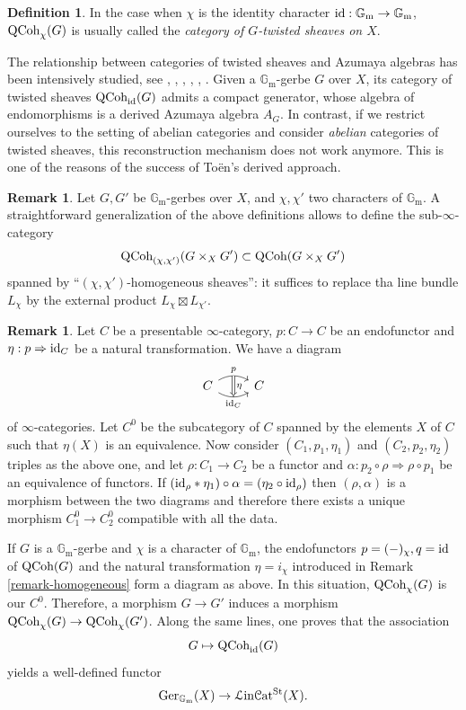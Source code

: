 \documentclass[11pt, twoside]{article} %
\numberwithin{equation}{section}
\theoremstyle{plain}
\theoremstyle{definition}
\newtheorem{defin}[thm]{Definition}
\newtheorem{rem}[thm]{Remark}
\newcommand{\Gm}{\mathbb G_{\mathrm{m}}}
\newcommand{\id}{\textup{id}}
\newcommand{\QCoh}{\textup{QCoh}}
\newcommand{\Ger}{\textup{Ger}}
\newcommand{\Lin}{\mathcal L\textup{in}\mathcal{C}\textup{at}^{\textup{St}}}
\begin{document}
	\begin{defin}\label{twisted-sheaves}
		In the case when $\chi$ is the identity character $\id:\Gm\to \Gm$, $\QCoh_\chi(G)$ is usually called the \textit{category of $G$-twisted sheaves on $X$}.
	\end{defin}
	
	The relationship between categories of twisted sheaves and Azumaya algebras has been intensively studied, see \cite{DeJong}, \cite{DeJong-Gabber}, \cite{Lieblich}, \cite{Hall-Rydh}, \cite{Bergh-Schnurer}, \cite{BP}. Given a $\Gm$-gerbe $G$ over $X$, its category of twisted sheaves $\QCoh_\id(G)$ admits a compact generator, whose algebra of endomorphisms is a derived Azumaya algebra $A_G$. In contrast, if we restrict ourselves to the setting of abelian categories and consider \textit{abelian} categories of twisted sheaves, this reconstruction mechanism does not work anymore. This is one of the reasons of the success of To\"en's derived approach.

 \begin{rem}\label{bi-homogeneous}
     Let $G,G'$ be $\Gm$-gerbes over $X$, and $\chi,\chi'$ two characters of $\Gm$. A straightforward generalization of the above definitions allows to define the sub-$\infty$-category $$\QCoh_{(\chi,\chi')}(G\times_XG')\subset \QCoh(G\times_XG')$$ spanned by ``$(\chi,\chi')$-homogeneous sheaves'': it suffices to replace tha line bundle $L_\chi$ by the external product $L_\chi\boxtimes L_{\chi'}$.
 \end{rem}


\begin{rem}\label{equalizer}
	 Let $C$ be a presentable $\infty$-category, $p:C \rightarrow C$ be an endofunctor and $\eta: p \Rightarrow \id_C$ be a natural transformation. We have a diagram 
 $$\begin{tikzcd}
    C \arrow[bend left]{r}[name=LUU]{p}
    \arrow[bend right]{r}[name=LDD,below]{\id_C}
    \arrow[Rightarrow,to path=(LUU) -- (LDD)\tikztonodes]{r}{\eta}
    & 
    C
  \end{tikzcd}$$ of $\infty$-categories. Let $C^0$ be the subcategory of $C$ spanned by the elements $X$ of $C$ such that $\eta(X)$ is an equivalence. 
Now consider $(C_1,p_1,\eta_1)$ and $(C_2,p_2,\eta_2)$ triples as the above one, and let $\rho:C_1 \rightarrow C_2$ be a functor and $\alpha: p_2\circ \rho \Rightarrow \rho \circ p_1$ be an equivalence of functors. If $(\id_{\rho} * \eta_1) \circ \alpha = (\eta_2 \circ \id_{\rho})$ then $(\rho,\alpha)$ is a morphism between the two diagrams and therefore there exists a unique morphism $C^0_1 \rightarrow C^0_2$ compatible with all the data.

If $G$ is a $\Gm$-gerbe and $\chi$ is a character of $\Gm$, the endofunctors $p=(-)_{\chi},q=\id$ of $\QCoh(G)$ and the natural transformation $\eta=i_{\chi}$ introduced in Remark \ref{remark-homogeneous} form a diagram as above. In this situation, $\QCoh_{\chi}(G)$ is our $C^0$. Therefore, a morphism $G\to G'$ induces a morphism $\QCoh_\chi(G)\to \QCoh_\chi(G')$. Along the same lines, one proves that the association $$G\mapsto \QCoh_\id(G)$$ yields a well-defined functor $$\Ger_{\Gm}(X)\to \Lin(X).$$
	\end{rem}
\end{document}
